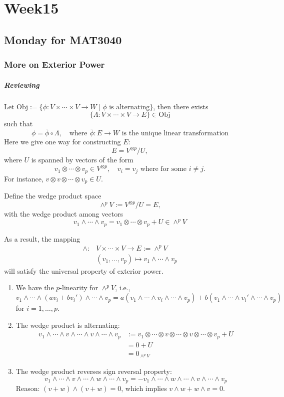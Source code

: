 \chapter{Week15}
\section{Monday for MAT3040}
\subsection{More on Exterior Power}
\paragraph{Reviewing}
Let $\text{Obj}:=\{\phi:V\times\cdots\times V\to W\mid\text{$\phi$ is alternating}\}$,
then there exists
\[
\{\Lambda:V\times\cdots\times V\to E\}\in\text{Obj}
\]
such that
\[
\phi = \bar{\phi}\circ\Lambda,\quad\text{where $\bar{\phi}:E\to W$ is the unique linear transformation}
\]
Here we give one way for constructing $E$:
\[
E = V^{\otimes p}/U,
\]
where $U$ is spanned by vectors of the form 
\[
v_1\otimes\cdots\otimes v_p\in V^{\otimes p},
\quad
v_i=v_j\text{ where for some $i\ne j$.}
\]
For instance, $v\otimes v\otimes\cdots\otimes v_p\in U$.

\begin{definition}
Define the wedge product space
\[
\wedge^pV:=V^{\otimes p}/U =E,
\]
with the wedge product among vectors
\[
v_1\wedge\cdots\wedge v_p = v_1\otimes\cdots\otimes v_p+U\in \wedge^pV
\]
\end{definition}
As a result, the mapping
\[
\begin{array}{ll}
\wedge:&V\times\cdots\times V\to E:=\wedge^pV\\
&(v_1,\dots,v_p)\mapsto v_1\wedge\cdots\wedge v_p
\end{array}	
\]
will satisfy the universal property of exterior power.

\begin{proposition}\label{pro:15:1}
\begin{enumerate}
\item
We have the $p$-linearity for $\wedge^pV$, i.e.,
\[
v_1\wedge\cdots\wedge(av_i+bv_i')\wedge\cdots\wedge v_p
=
a
(v_1\wedge\cdots\wedge v_i\wedge\cdots\wedge v_p)
+
b
(v_1\wedge\cdots\wedge v_i'\wedge\cdots\wedge v_p)
\]
for $i=1,\dots,p$.
\item
The wedge product is alternating:
\begin{align*}
v_1\wedge\cdots\wedge v\wedge\cdots \wedge v\wedge\cdots\wedge v_p&:=v_1\otimes\cdots\otimes v\otimes\cdots \otimes v\otimes\cdots\otimes v_p+U\\
&=0+U\\
&=0_{\wedge^pV}
\end{align*}
\item
The wedge product reverses sign reversal property:
\[
v_1\wedge\cdots\wedge v\wedge\cdots\wedge w\wedge\cdots\wedge v_p
=
-
v_1\wedge\cdots\wedge w\wedge\cdots\wedge v\wedge\cdots\wedge v_p
\]
Reason: $(v+w)\wedge(v+w)=0$, which implies $v\wedge w+w\wedge v=0$.
\end{enumerate}
\end{proposition}

